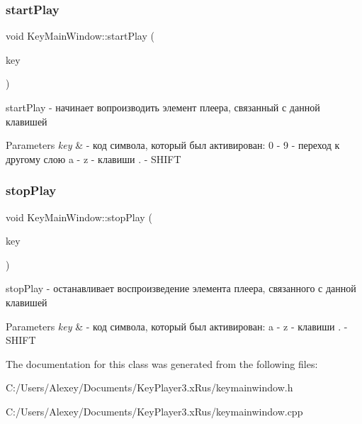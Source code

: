 \subsubsection{\texorpdfstring{start\+Play}{startPlay}}
{\footnotesize\ttfamily void Key\+Main\+Window\+::start\+Play (\begin{DoxyParamCaption}\item[{Q\+Char}]{key }\end{DoxyParamCaption})\hspace{0.3cm}{\ttfamily [slot]}}



start\+Play -\/ начинает вопроизводить элемент плеера, связанный с данной клавишей 


\begin{DoxyParams}{Parameters}
{\em key} & -\/ код символа, который был активирован\+: \textquotesingle{}0\textquotesingle{} -\/ \textquotesingle{}9\textquotesingle{} -\/ переход к другому слою \textquotesingle{}a\textquotesingle{} -\/ \textquotesingle{}z\textquotesingle{} -\/ клавиши \textquotesingle{}.\textquotesingle{} -\/ S\+H\+I\+FT \\
\hline
\end{DoxyParams}
\mbox{\label{class_key_main_window_a545142222ff293b73d57fb22ac6a122d}} 
\subsubsection{\texorpdfstring{stop\+Play}{stopPlay}}
{\footnotesize\ttfamily void Key\+Main\+Window\+::stop\+Play (\begin{DoxyParamCaption}\item[{Q\+Char}]{key }\end{DoxyParamCaption})\hspace{0.3cm}{\ttfamily [slot]}}



stop\+Play -\/ останавливает воспроизведение элемента плеера, связанного с данной клавишей 


\begin{DoxyParams}{Parameters}
{\em key} & -\/ код символа, который был активирован\+: \textquotesingle{}a\textquotesingle{} -\/ \textquotesingle{}z\textquotesingle{} -\/ клавиши \textquotesingle{}.\textquotesingle{} -\/ S\+H\+I\+FT \\
\hline
\end{DoxyParams}


The documentation for this class was generated from the following files\+:\begin{DoxyCompactItemize}
\item 
C\+:/\+Users/\+Alexey/\+Documents/\+Key\+Player3.\+x\+Rus/keymainwindow.\+h\item 
C\+:/\+Users/\+Alexey/\+Documents/\+Key\+Player3.\+x\+Rus/keymainwindow.\+cpp\end{DoxyCompactItemize}
